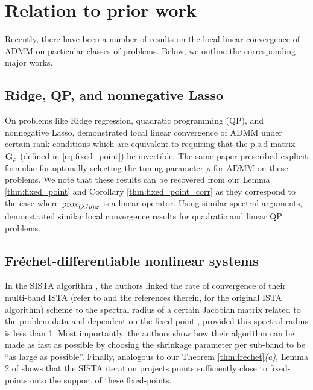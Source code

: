 \section{Relation to prior work}
\label{sec:lit}
Recently, there have been a number of results on the local
linear convergence of ADMM on particular classes of problems. Below,
we outline the corresponding major works.

\subsection{{Ridge, QP, and nonnegative Lasso}} On problems like
Ridge regression, quadratic programming (QP), and
nonnegative Lasso, \citep{ghadimi2013optimal} demonstrated local linear
convergence of ADMM under certain rank conditions which
are equivalent to requiring that the p.s.d matrix $\mathbf{G}_\rho$ (defined in
\eqref{eq:fixed_point}) be invertible. The same paper
prescribed explicit formulae for optimally selecting the tuning
parameter $\rho$ for ADMM on these problems. %
We note that these results can be recovered from our Lemma
\ref{thm:fixed_point} and Corollary \ref{thm:fixed_point_corr} as they
correspond to the case where
$\operatorname{prox}_{(\lambda/\rho)\varphi}$ is a linear operator. Using
similar spectral arguments, \citep{boley2013} demonstrated similar
local convergence results for quadratic and linear QP problems.

\subsection{{Fr\'echet-differentiable nonlinear systems}} In the SISTA
algorithm \citep{bayram2010subband},
the authors linked the rate of convergence of their multi-band
ISTA (refer to \citep{daubechies2004} and the references therein,
for the original ISTA algorithm)
 scheme to the spectral radius of a certain Jacobian matrix related to
 the problem data and dependent on the fixed-point \cite[Propositions
   6 and  7]{bayram2010subband}, provided this spectral radius is less
 than 1.
Most importantly, the authors show \cite[Proposition
   8]{bayram2010subband} how their algorithm can be made as fast as
 possible by choosing the shrinkage parameter per sub-band to be ``as
 large as possible''. Finally, analogous to our Theorem
\ref{thm:frechet}\textit{(a)}, Lemma 2 of \citep{bayram2010subband}
shows that the SISTA iteration projects points sufficiently close to
fixed-points onto the support of these fixed-points. 

